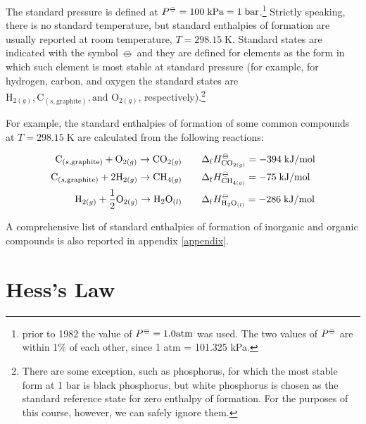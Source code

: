 \documentclass[
  9pt,
]{extbook}
\theoremstyle{definition}
\theoremstyle{definition}
\theoremstyle{definition}
\theoremstyle{remark}
\begin{document}
The standard pressure is defined at \(P^{{-\kern-6pt{\ominus}\kern-6pt-}} = 100 \; \mathrm{kPa} = 1 \; \mathrm{bar}\).\footnote{prior to 1982 the value of \(P^{{-\kern-6pt{\ominus}\kern-6pt-}} = 1.0 \mathrm{ atm}\) was used. The two values of \(P^{-\kern-6pt{\ominus}\kern-6pt-}\) are within 1\% of each other, since 1 atm = 101.325 kPa.} Strictly speaking, there is no standard temperature, but standard enthalpies of formation are usually reported at room temperature, \(T = 298.15 \; \mathrm{K}\). Standard states are indicated with the symbol \({-\kern-6pt{\ominus}\kern-6pt-}\) and they are defined for elements as the form in which such element is most stable at standard pressure (for example, for hydrogen, carbon, and oxygen the standard states are \(\mathrm{H}_{2(g)}, \mathrm{C}_{(s,\text{graphite})}, \text{and }\mathrm{O}_{2(g)}\), respectively).\footnote{There are some exception, such as phosphorus, for which the most stable form at 1 bar is black phosphorus, but white phosphorus is chosen as the standard reference state for zero enthalpy of formation. For the purposes of this course, however, we can safely ignore them.}

For example, the standard enthalpies of formation of some common compounds at \(T = 298.15 \; \mathrm{K}\) are calculated from the following reactions:

\begin{equation}
\begin{aligned}
  \mathrm{C}_{(s,\text{graphite})}+\mathrm{O}_{2(g)} \rightarrow \mathrm{CO}_{2(g)} \qquad & \Delta_{\mathrm{f}} H_{\mathrm{CO}_{2(g)}}^{-\kern-6pt{\ominus}\kern-6pt-}= -394 \; \text{kJ/mol} \\
   \mathrm{C}_{(s,\text{graphite})}+2 \mathrm{H}_{2(g)} \rightarrow \mathrm{CH}_{4(g)} \qquad & \Delta_{\mathrm{f}} H_{\mathrm{CH}_{4(g)}}^{-\kern-6pt{\ominus}\kern-6pt-}= -75 \; \text{kJ/mol} \\ 
   \mathrm{H}_{2(g)}+\frac{1}{2} \mathrm{O}_{2(g)} \rightarrow \mathrm{H}_2 \mathrm{O}_{(l)} \qquad & \Delta_{\mathrm{f}} H_{\mathrm{H}_2 \mathrm{O}_{(l)}}^{-\kern-6pt{\ominus}\kern-6pt-}= -286 \; \text{kJ/mol} 
\end{aligned}
\label{eq:someDfH}
\end{equation}

A comprehensive list of standard enthalpies of formation of inorganic and organic compounds is also reported in appendix \ref{appendix}.

\hypertarget{hessslaw}{%
\section{Hess's Law}\label{hessslaw}}
\end{document}
